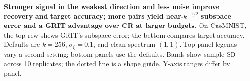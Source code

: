 \textbf{Stronger signal in the weakest direction and less noise improve recovery and target accuracy; more pairs yield near-$k^{-1/2}$ subspace error and a GRIT advantage over CR at larger budgets.} On CueMNIST, the top row shows GRIT's subspace error; the bottom compares target accuracy. Defaults are $k=256$, $\sigma_\xi=0.1$, and clean spectrum $(1,1)$. Top-panel legends vary a second setting; bottom panels use the defaults. Bands show sample SD across 10 replicates; the dotted line is a shape guide. Y-axis ranges differ by panel.
